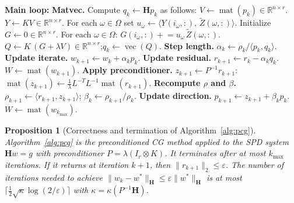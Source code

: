 \documentclass[12pt]{article}
\newtheorem{proposition}[theorem]{Proposition}
\theoremstyle{definition}
\newcommand{\vecop}{\operatorname{vec}}
\newcommand{\matop}{\operatorname{mat}}
\newcommand{\R}{\mathbb{R}}
\newcommand{\Zt}{\widetilde{Z}}
\begin{document}
\begin{algorithm}[ht]
\begin{algorithmic}[1]
\Statex \textbf{Main loop:}
   \State \textbf{Matvec.} Compute $q_k\leftarrow \mathbf{H} p_k$ as follows:
   \State \quad $V\leftarrow \matop(p_k)\in\R^{n\times r}$.
   \State \quad $Y\leftarrow K V\in\R^{n\times r}$. 
   \State \quad For each $\omega\in\Omega$ set $u_\omega\leftarrow \langle Y(i_\omega,:),\,\Zt(\omega,:)\rangle$.
   \State \quad Initialize $G\leftarrow 0\in\R^{n\times r}$. For each $\omega\in\Omega$:
          $G(i_\omega,:) \mathrel{+}= u_\omega\,\Zt(\omega,:)$. 
   \State \quad $Q\leftarrow K\,(G+\lambda V)\in\R^{n\times r}$;\quad $q_k\leftarrow\vecop(Q)$.
   \State \textbf{Step length.} $\alpha_k\leftarrow \rho_k / \langle p_k,q_k\rangle$.
   \State \textbf{Update iterate.} $w_{k+1}\leftarrow w_k+\alpha_k p_k$.
   \State \textbf{Update residual.} $r_{k+1}\leftarrow r_k-\alpha_k q_k$.
       \State \Return $W\leftarrow \matop(w_{k+1})$.
   \EndIf
   \State \textbf{Apply preconditioner.} $z_{k+1}\leftarrow P^{-1} r_{k+1}$:\quad
          $\matop(z_{k+1})\leftarrow \tfrac{1}{\lambda}L^{-T}L^{-1}\matop(r_{k+1})$.
   \State \textbf{Recompute $\rho$ and $\beta$.}\;
          $\rho_{k+1}\leftarrow\langle r_{k+1},z_{k+1}\rangle$;\quad
          $\beta_k\leftarrow \rho_{k+1}/\rho_k$.
   \State \textbf{Update direction.} $p_{k+1}\leftarrow z_{k+1}+\beta_k p_k$.
\EndFor
\State \Return $W\leftarrow \matop(w_{k_{\max}})$.
\end{algorithmic}
\end{algorithm}

\begin{proposition}[Correctness and termination of Algorithm~\ref{alg:pcg}]\label{prop:pcg-correct}
Algorithm~\ref{alg:pcg} is the preconditioned CG method applied to the SPD system $\mathbf{H}w=g$
with preconditioner $P=\lambda(I_r\otimes K)$. It terminates after at most $k_{\max}$
iterations. If it returns at iteration $k+1$, then $\|r_{k+1}\|_2\leq\varepsilon$. The number of
iterations needed to achieve $\|w_k-w^*\|_{\mathbf{H}}\leq\varepsilon\|w^*\|_{\mathbf{H}}$ is at
most $\lceil \tfrac{1}{2}\sqrt{\kappa}\log(2/\varepsilon)\rceil$ with
$\kappa=\kappa(P^{-1}\mathbf{H})$.
\end{proposition}
\end{document}

